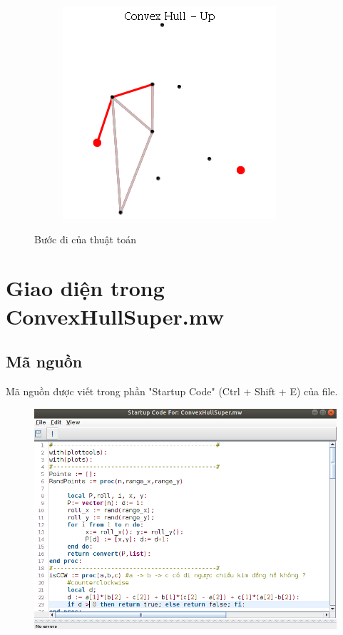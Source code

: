 \documentclass[12pt]{article}
\begin{document}
\begin{figure}[h]
\begin{subfigure}[h]{0.3\linewidth}
              \caption{}
            \end{subfigure}
            \begin{subfigure}[h]{0.3\linewidth}
              \includegraphics[width=\linewidth]{GIF/Up-10}
              \caption{}
            \end{subfigure}
            \caption{Bước đi của thuật toán}
          \end{figure}
        \newpage
    \section{Giao diện trong ConvexHullSuper.mw}
      \subsection{Mã nguồn}  
        Mã nguồn được viết trong phần "Startup Code" (Ctrl + Shift + E)
        của file.
        \begin{figure}[h!]
          \centering
          \includegraphics[scale=0.5]{Image/codeMaple}
        \end{figure}
        \newpage
\end{document}
